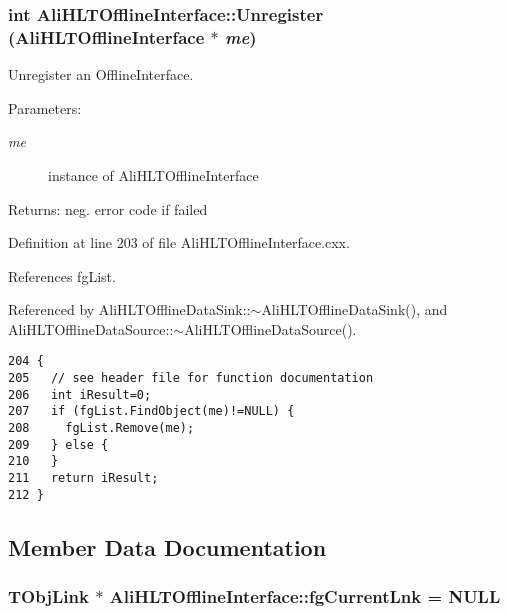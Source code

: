 \subsubsection{\setlength{\rightskip}{0pt plus 5cm}int Ali\-HLTOffline\-Interface::Unregister ({\bf Ali\-HLTOffline\-Interface} $\ast$ {\em me})\hspace{0.3cm}{\tt  [static, protected]}}\label{classAliHLTOfflineInterface_f1}


Unregister an Offline\-Interface. \begin{Desc}
\item[Parameters:]
\begin{description}
\item[{\em me}]instance of Ali\-HLTOffline\-Interface \end{description}
\end{Desc}
\begin{Desc}
\item[Returns:]neg. error code if failed \end{Desc}


Definition at line 203 of file Ali\-HLTOffline\-Interface.cxx.

References fg\-List.

Referenced by Ali\-HLTOffline\-Data\-Sink::$\sim$Ali\-HLTOffline\-Data\-Sink(), and Ali\-HLTOffline\-Data\-Source::$\sim$Ali\-HLTOffline\-Data\-Source().

\footnotesize\begin{verbatim}204 {
205   // see header file for function documentation
206   int iResult=0;
207   if (fgList.FindObject(me)!=NULL) {
208     fgList.Remove(me);
209   } else {
210   }
211   return iResult;
212 }
\end{verbatim}\normalsize 




\subsection{Member Data Documentation}
\subsubsection{\setlength{\rightskip}{0pt plus 5cm}TObj\-Link $\ast$ {\bf Ali\-HLTOffline\-Interface::fg\-Current\-Lnk} = NULL\hspace{0.3cm}{\tt  [static, private]}}\label{classAliHLTOfflineInterface_v1}


